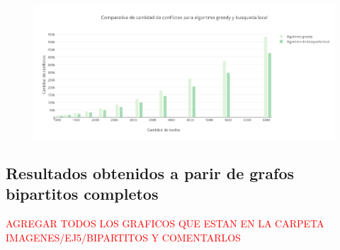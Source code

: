  \begin{figure}[H]
    \begin{center}
  	\includegraphics[width=18cm]{imagenes/Ej5/ComparacionConflictosCompleto.png}
 	\label{ComparacionConflictosCompleto}
    \end{center}
  \end{figure}

\subsection {Resultados obtenidos a parir de grafos bipartitos completos} 

\textcolor{red}{\huge{AGREGAR TODOS LOS GRAFICOS QUE ESTAN EN LA CARPETA IMAGENES/EJ5/BIPARTITOS Y COMENTARLOS}}